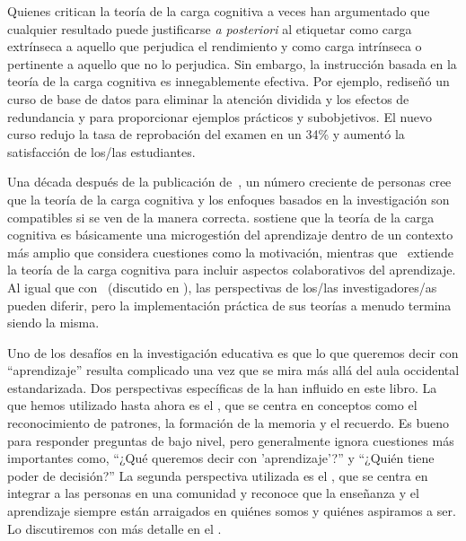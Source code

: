 
Quienes critican la teoría de la carga cognitiva a veces han argumentado que
cualquier resultado puede justificarse \emph{a posteriori} al etiquetar como carga extrínseca a
aquello que perjudica el rendimiento 
y como carga intrínseca o pertinente a aquello que no lo perjudica.
Sin embargo,
la instrucción basada en la teoría de la carga cognitiva es innegablemente efectiva.
Por ejemplo,
\cite{Maso2016} rediseñó un curso de base de datos para eliminar la atención dividida y los efectos de redundancia
y para proporcionar ejemplos prácticos y subobjetivos.
El nuevo curso redujo la tasa de reprobación del examen en un 34\%
y aumentó la satisfacción de los/las estudiantes.

Una década después de la publicación de~\cite{Kirs2006},
un número creciente de personas cree que la teoría de la carga cognitiva y los enfoques basados ​​en la investigación son compatibles
si se ven de la manera correcta.
\cite{Kaly2015} sostiene que la teoría de la carga cognitiva es básicamente una microgestión del aprendizaje
dentro de un contexto más amplio que considera cuestiones como la motivación,
mientras que~\cite{Kirs2018} extiende la teoría de la carga cognitiva para incluir aspectos colaborativos del aprendizaje.
Al igual que con~\cite{Mark2018} (discutido en ),
las perspectivas de los/las investigadores/as pueden diferir,
pero la implementación práctica de sus teorías a menudo termina siendo la misma.

Uno de los desafíos en la investigación educativa es que
lo que queremos decir con ``aprendizaje'' resulta complicado
una vez que se mira más allá del aula occidental estandarizada.
Dos perspectivas específicas de la  han influido en este libro.
La que hemos utilizado hasta ahora es el ,
que se centra en conceptos como el reconocimiento de patrones, la formación de la memoria y el recuerdo.
Es bueno para responder preguntas de bajo nivel,
pero generalmente ignora cuestiones más importantes como,
``¿Qué queremos decir con 'aprendizaje'?'' y
``¿Quién tiene poder de decisión?''
La segunda perspectiva utilizada es el ,
que se centra en integrar a las personas en una comunidad
y reconoce que
la enseñanza y el aprendizaje siempre están arraigados en quiénes somos y quiénes aspiramos a ser.
Lo discutiremos con más detalle en el .


